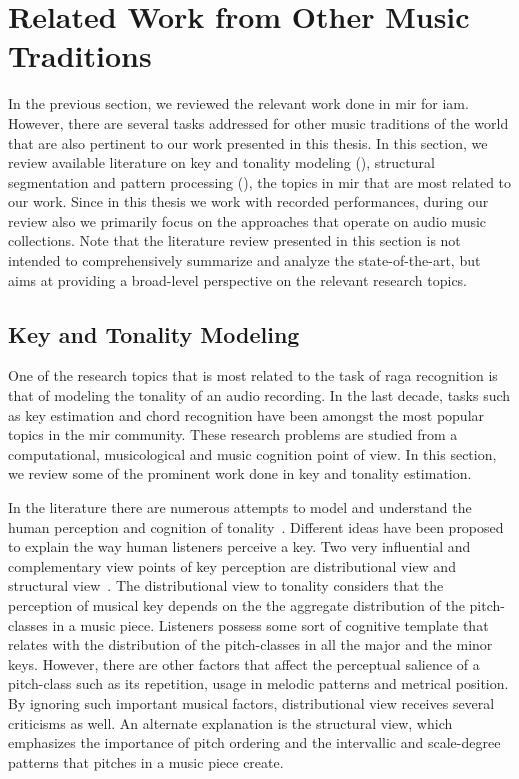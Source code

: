 \section{Related Work from Other Music Traditions}
\label{sec:background_relevant_work_other_music}

In the previous section, we reviewed the relevant work done in \gls{mir} for \gls{iam}. However, there are several tasks addressed for other music traditions of the world that are also pertinent to our work presented in this thesis. In this section, we review available literature on key and tonality modeling (), structural segmentation and pattern processing (), the topics in \gls{mir} that are most related to our work. Since in this thesis we work with recorded performances, during our review also we primarily focus on the approaches that operate on audio music collections. Note that the literature review presented in this section is not intended to comprehensively summarize and analyze the state-of-the-art, but aims at providing a broad-level perspective on the relevant research topics.

\subsection{Key and Tonality Modeling}
\label{sec:background_key_and_tonality_modeling}

One of the research topics that is most related to the task of \gls{raga} recognition is that of modeling the tonality of an audio recording. In the last decade, tasks such as key estimation and chord recognition have been amongst the most popular topics in the \gls{mir} community. These research problems are studied from a computational, musicological and music cognition point of view. In this section, we review some of the prominent work done in key and tonality estimation. 

In the literature there are numerous attempts to model and understand the human perception and cognition of tonality~\citep{longuet1971interpreting,krumhansl1979quantification,chew2000towards,krumhansl2000tonality,cohen1991tonality}. Different ideas have been proposed to explain the way human listeners perceive a key. Two very influential and complementary view points of key perception are distributional view and structural view~\citep{Brown1988,temperley2008pitch}.  The distributional view to tonality considers that the perception of musical key depends on the the aggregate distribution of the pitch-classes in a music piece. Listeners possess some sort of cognitive template that relates with the distribution of the pitch-classes in all the major and the minor keys. However, there are other factors that affect the perceptual salience of a pitch-class such as its repetition, usage in melodic patterns and metrical position. By ignoring such important musical factors, distributional view receives several criticisms as well. An alternate explanation is the structural view, which emphasizes the importance of pitch ordering and the intervallic and scale-degree patterns that pitches in a music piece create.

